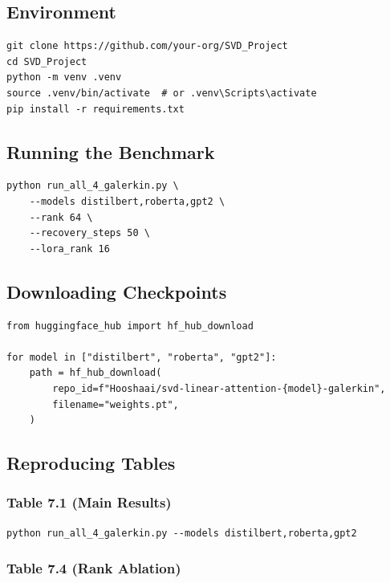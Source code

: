 \subsection{Environment}

\begin{lstlisting}
git clone https://github.com/your-org/SVD_Project
cd SVD_Project
python -m venv .venv
source .venv/bin/activate  # or .venv\Scripts\activate
pip install -r requirements.txt
\end{lstlisting}

\subsection{Running the Benchmark}

\begin{lstlisting}
python run_all_4_galerkin.py \
    --models distilbert,roberta,gpt2 \
    --rank 64 \
    --recovery_steps 50 \
    --lora_rank 16
\end{lstlisting}

\subsection{Downloading Checkpoints}

\begin{lstlisting}
from huggingface_hub import hf_hub_download

for model in ["distilbert", "roberta", "gpt2"]:
    path = hf_hub_download(
        repo_id=f"Hooshaai/svd-linear-attention-{model}-galerkin",
        filename="weights.pt",
    )
\end{lstlisting}

\subsection{Reproducing Tables}

\subsubsection{Table 7.1 (Main Results)}

\begin{lstlisting}
python run_all_4_galerkin.py --models distilbert,roberta,gpt2
\end{lstlisting}

\subsubsection{Table 7.4 (Rank Ablation)}

